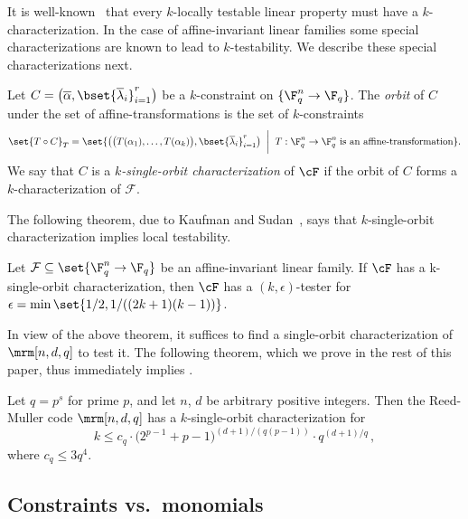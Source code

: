 It is well-known~\cite{BHR05} that every $k$-locally testable linear property must have a
$k$-characterization. In the case of affine-invariant linear families some special characterizations
are known to lead to $k$-testability. We describe these special characterizations next.

\begin{definition}\label{defn:single orbit}
Let $C=\big(\overline \alpha, \bset{\overline \lambda_i}_{i=1}^{r}\big)$ be a $k$-constraint
on $\{\F_{q}^n \to \F_q\}$.
The \emph{orbit} of $C$ under the set of affine-transformations is the set of $k$-constraints
\[\set{T \circ C}_T = \set{ \big( \big(T(\alpha_1),\ldots,T(\alpha_k)\big), \bset{\overline \lambda_i}_{i=1}^{r} \big)\; \; \bigg| \; \; T:\F_{q}^n \to \F_q^n \; \text{is an affine-transformation}}.\]
We say that $C$ is a \emph{$k$-single-orbit characterization} of $\cF$
if the orbit of $C$ forms a $k$-characterization of $\mathcal{F}$.
\end{definition}

The following theorem, due to Kaufman and Sudan~\cite{KS08}, says that $k$-single-orbit characterization implies local testability.

\begin{theorem}\label{thm:KS}
Let $\mathcal{F} \subseteq \set{\F_{q}^n \to \F_q}$ be an affine-invariant linear family. If
$\cF$ has a k-single-orbit characterization, then $\cF$ has a
$(k,\epsilon)$-tester for 
$\epsilon = \min\set{1/2, {1}/{((2k+1)(k-1))}}$.

\end{theorem}

In view of the above theorem, it suffices to find a single-orbit
characterization of $\mrm[n,d,q]$ to test it. The following theorem,
which we prove in the rest of this paper, thus immediately implies
.

\begin{theorem}\label{thm:main}
Let $q = p^s$ for prime $p$, and let $n$, $d$ be arbitrary positive
integers.
Then the Reed-Muller code $\mrm[n,d,q]$ has a $k$-single-orbit characterization for
 \[k \leq c_q \cdot  \big(2^{p-1}+p-1\big)^{(d+1)/(q(p-1))} \cdot q^{(d+1)/q}\,,\]
where $c_q \leq 3q^4$.
\end{theorem}

\subsection{Constraints vs.\ monomials}

